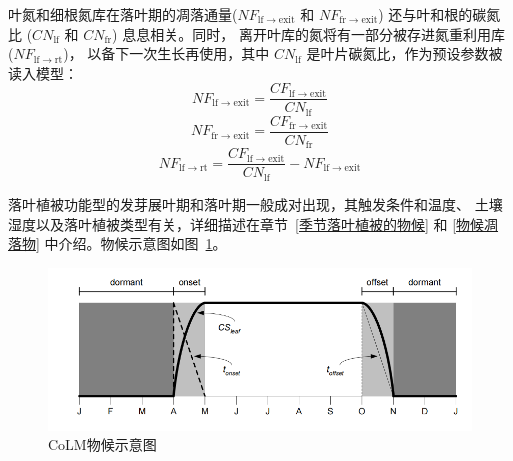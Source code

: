 \begin{enumerate}
    叶氮和细根氮库在落叶期的凋落通量($NF_{\mathrm{lf\rightarrow exit}}$ 和 $NF_{\mathrm{fr\rightarrow exit}}$)
    还与叶和根的碳氮比 ($CN_{\mathrm{lf}}$ 和 $CN_{\mathrm{fr}}$) 息息相关。同时，
    离开叶库的氮将有一部分被存进氮重利用库 ($NF_{\mathrm{lf\rightarrow rt}}$)，
    以备下一次生长再使用，其中 $CN_{\mathrm{lf}}$ 是叶片碳氮比，作为预设参数被读入模型：
    \begin{equation}
      NF_{\mathrm{lf\rightarrow exit}} = \frac{CF_{\mathrm{lf\rightarrow exit}}}{CN_{\mathrm{lf}}}
    \end{equation}
    \begin{equation}
      NF_{\mathrm{fr\rightarrow exit}} = \frac{CF_{\mathrm{fr\rightarrow exit}}}{CN_{\mathrm{fr}}}
    \end{equation}
    \begin{equation}
      NF_{\mathrm{lf\rightarrow rt}} = \frac{CF_{\mathrm{lf\rightarrow exit}}}{CN_{\mathrm{lf}}}-NF_{\mathrm{lf\rightarrow exit}}
    \end{equation}

    落叶植被功能型的发芽展叶期和落叶期一般成对出现，其触发条件和温度、
    土壤湿度以及落叶植被类型有关，详细描述在章节~\ref{季节落叶植被的物候} 和 \ref{物候凋落物} 中介绍。物候示意图如图~\ref{fig:CoLM物候示意图}。
    {
      \begin{figure}[htbp]
        \centering
        \includegraphics{Figures/植被生物地球化学循环过程/CoLM物候示意图.png}
        \caption{CoLM物候示意图~\citep{lawrence2018} }
        \label{fig:CoLM物候示意图}
      \end{figure}
    }


\end{enumerate}
